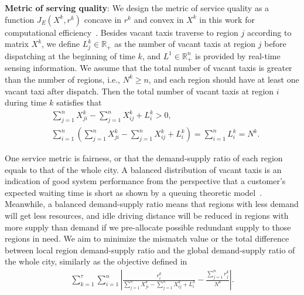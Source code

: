 \documentclass[10pt,twocolumn,twoside,english]{IEEEtran}
\begin{document}
\textbf{Metric of serving quality}:
We design the metric of service quality as a function $J_E (X^k, r^k)$ concave in $r^k$ and convex in $X^k$ in this work for computational efficiency~\cite{robustconvex}. Besides vacant taxis traverse to region $j$ according to matrix $X^k$, we define $L^k_j \in \mathbb{R}_+$ as the number of vacant taxis at region $j$ before dispatching at the beginning of time $k$, and $L^1 \in \mathbb{R}_+^{n}$ is provided by real-time sensing information. We assume that the total number of vacant taxis is greater than the number of regions, i.e., $N^k \geqslant n$, and each region should have at least one vacant taxi after dispatch. Then the total number of vacant taxis at region $i$ during time $k$ satisfies that
\begin{align}
&\sum_{j=1}^{n} X^k_{ji}-\sum_{j=1}^{n} X^k_{ij} + L^k_i >0,\label{total_i}\\
&\sum_{i=1}^{n}\left (\sum_{j=1}^{n} X^k_{ji}-\sum_{j=1}^{n} X^k_{ij} + L^k_i \right)=\sum_{i=1}^n L^k_i =N^k.
\label{total_N}
\end{align}


One service metric is fairness, or that the demand-supply ratio of each region equals to that of the whole city. A balanced distribution of vacant taxis is an indication of good system performance from the perspective that a customer's expected waiting time is short as shown by a queuing theoretic model~\cite{mod}. Meanwhile, a balanced demand-supply ratio means that regions with less demand will get less resources, and idle driving distance will be reduced in regions with more supply than demand if we pre-allocate possible redundant supply to those regions in need. We aim to minimize the mismatch value or the total difference between local region demand-supply ratio and the global demand-supply ratio of the whole city, similarly as the objective defined in~\cite{taxi_Feiiccps15,Miao_tase16}
\begin{align}
	\sum_{k=1}^{\tau} \sum_{i=1}^{n}\left|\frac{r^k_i}{\sum\limits_{j=1}^{n} X^k_{ji}-\sum\limits_{j=1}^{n} X^k_{ij} + L^k_i}-\frac{\sum\limits_{j=1}^{n} r_j^k}{N^k}\right|.
	\label{mismatch}
\end{align}
\end{document}
